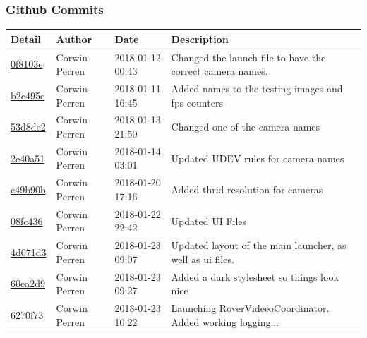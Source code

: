 \subsubsection{Github Commits}
\begin{center}
\begin{tabular}{l l l l}	\textbf{Detail} & \textbf{Author} & \textbf{Date} &\textbf{Description}\\\hline
\href{https://github.com/OSURoboticsClub/Rover_2017_2018/commit/0f8103eb2dc990541e7f181bd4ac8afa3c5b06a1}{0f8103e} & Corwin Perren & 2018-01-12 00:43 &Changed the launch file to have the correct camera names.\\\hline
\href{https://github.com/OSURoboticsClub/Rover_2017_2018/commit/b2c495e6b69c4f38cd2d4e6e1ac0a48703fac9f1}{b2c495e} & Corwin Perren & 2018-01-11 16:45 &Added names to the testing images and fps counters\\\hline
\href{https://github.com/OSURoboticsClub/Rover_2017_2018/commit/53d8de2ea80d6034f0906da0aa5e2d3df0dd6aae}{53d8de2} & Corwin Perren & 2018-01-13 21:50 &Changed one of the camera names\\\hline
\href{https://github.com/OSURoboticsClub/Rover_2017_2018/commit/2e40a51e830b5ffffd97820d597b73360b716d12}{2e40a51} & Corwin Perren & 2018-01-14 03:01 &Updated UDEV rules for camera names\\\hline
\href{https://github.com/OSURoboticsClub/Rover_2017_2018/commit/c49b90b038ad2b31b2b1643f9f55f86c5cdfa658}{c49b90b} & Corwin Perren & 2018-01-20 17:16 &Added thrid resolution for cameras\\\hline
\href{https://github.com/OSURoboticsClub/Rover_2017_2018/commit/08fc436fa277f839826840774823bae37c9bc45e}{08fc436} & Corwin Perren & 2018-01-22 22:42 &Updated UI Files\\\hline
\href{https://github.com/OSURoboticsClub/Rover_2017_2018/commit/4d071d304ed3781c89f4a5067644981131a33226}{4d071d3} & Corwin Perren & 2018-01-23 09:07 &Updated layout of the main launcher, as well as ui files.\\\hline
\href{https://github.com/OSURoboticsClub/Rover_2017_2018/commit/60ea2d9339e11a6ec749b47d5b5487ccb39d8f09}{60ea2d9} & Corwin Perren & 2018-01-23 09:27 &Added a dark stylesheet so things look nice\\\hline
\href{https://github.com/OSURoboticsClub/Rover_2017_2018/commit/6270f7380f6fd9b73c99193c93860d4042816e7b}{6270f73} & Corwin Perren & 2018-01-23 10:22 &Launching RoverVideeoCoordinator. Added working logging... \\\hline

\end{tabular}
\end{center}
